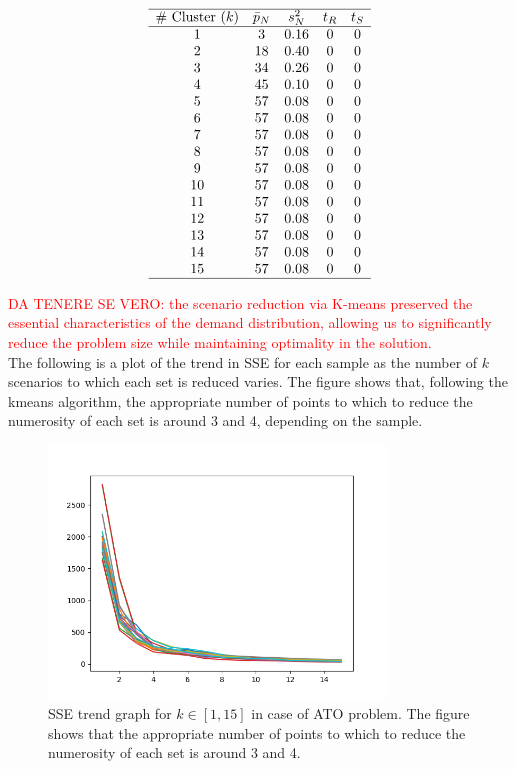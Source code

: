 \documentclass[a4paper,12pt]{article}
\begin{document}
	\[
	\begin{array}{ccccc}
		\hline
		\text{\# Cluster $(k)$} & \text{$\bar{p}_{N}$} & \text{$s_{N}^{2}$} & \text{$t_{R}$} & \text{$t_{S}$}\\
		\hline
		1 & 3 & 0.16 & 0 & 0\\
		2 & 18 & 0.40 & 0 & 0\\
		3 & 34 & 0.26 & 0 & 0\\
		4 & 45 & 0.10 & 0 & 0\\
		5 & 57 & 0.08 & 0 & 0\\
		6 & 57 & 0.08 & 0 & 0\\
		7 & 57 & 0.08 & 0 & 0\\
		8 & 57 & 0.08 & 0 & 0\\
		9 & 57 & 0.08 & 0 & 0\\
		10 & 57 & 0.08 & 0 & 0\\
		11 & 57 & 0.08 & 0 & 0\\
		12 & 57& 0.08 & 0 & 0\\
		13 & 57 & 0.08 & 0 & 0\\
		14 & 57 & 0.08 & 0 & 0\\
		15 & 57 & 0.08 & 0 & 0\\
		\hline
	\end{array}
	\]
	\label{tab:kmeans-ato-results}
	
	
	
	\textcolor{red}{DA TENERE SE VERO: the scenario reduction via K-means preserved the essential characteristics of the demand distribution, allowing us to significantly reduce the problem size while maintaining optimality in the solution.}	\\
	
	\noindent The following is a plot of the trend in SSE for each sample as the number of $k$ scenarios to which each set is reduced varies. The figure shows that, following the kmeans algorithm, the appropriate number of points to which to reduce the numerosity of each set is around 3 and 4, depending on the sample.
	
	
	\begin{figure}[H]
		\centering
		\includegraphics[width=0.8\textwidth]{../immagini/sseATO.png}
		\caption{SSE trend graph for $k \in [1,15]$ in case of ATO problem. The figure shows that the appropriate number of points to which to reduce the numerosity of each set is around 3 and 4.}
		\label{fig:sse-ato}
	\end{figure}
	
\end{document}
